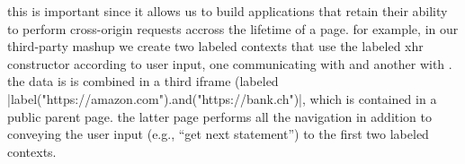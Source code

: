 this is important since it allows us to build applications that retain
their ability to perform cross-origin requests accross the lifetime of
a page.
%
for example, in our third-party mashup we create two labeled contexts
that use the labeled xhr constructor according to user input, one
communicating with  and another with
.
%
the data is is combined in a third iframe (labeled
\js|label("https://amazon.com").and("https://bank.ch")|, which is
contained in a public parent page.
%
the latter page performs all the navigation in addition to conveying
the user input (e.g., ``get next statement'') to the first two
labeled contexts.




